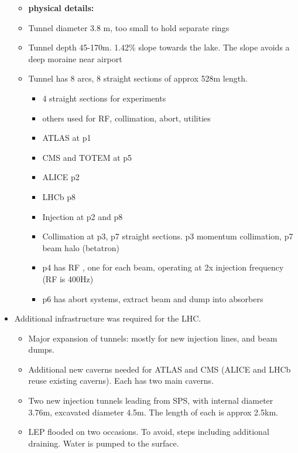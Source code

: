 \begin{itemize}
\begin{itemize}
        \item \textbf{physical details:}
        \item Tunnel diameter 3.8 m, too small to hold separate rings \cite{lyndon}
        \item Tunnel depth 45-170m. 1.42\% slope towards the lake. The slope avoids a deep moraine near airport \cite{lhcDesignV2}
        \item Tunnel has 8 arcs, 8 straight sections of approx 528m length. \cite{lyndon}
        \begin{itemize}\scriptsize
            \item 4 straight sections for experiments \cite{lyndon}
            \item others used for RF, collimation, abort, utilities \cite{lyndon}
            \item ATLAS at p1 \cite{lyndon}
            \item CMS and TOTEM at p5 \cite{lyndon}
            \item ALICE p2 \cite{lyndon}
            \item LHCb p8 \cite{lyndon}
            \item Injection at p2 and p8 \cite{lyndon}
            \item Collimation at p3, p7 straight sections. p3 momentum collimation, p7 beam halo (betatron) \cite{lyndon}
            \item p4 has RF , one for each beam, operating at 2x injection frequency (RF is 400Hz) \cite{lyndon}
            \item p6 has abort systems, extract beam and dump into absorbers \cite{lyndon}
        \end{itemize}
    \end{itemize}
    \item Additional infrastructure was required for the LHC.
    \begin{itemize}\scriptsize
        \item Major expansion of tunnels: mostly for new injection lines, and beam dumps. \cite{lhcDesignV2}
        \item Additional new caverns needed for ATLAS and CMS (ALICE and LHCb reuse existing caverns). Each has two main caverns. \cite{lhcDesignV2}
        \item Two new injection tunnels leading from SPS, with internal diameter 3.76m, excavated diameter 4.5m. The length of each is approx 2.5km. \cite{lhcDesignV2}
        \item LEP flooded on two occasions. To avoid, steps including additional draining. Water is pumped to the surface. \cite{lhcDesignV2}

\end{itemize}
\end{itemize}
